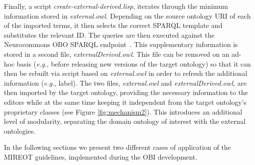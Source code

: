 \documentclass{ao2e}%
\begin{document}
Finally, a script \emph{create-external-derived.lisp}, iterates through the minimum information stored in \emph{external.owl}.
Depending on the source ontology URI of each of the imported terms, it then selects the correct SPARQL template and substitutes the relevant ID.
The queries are then executed against the Neurocommons OBO SPARQL endpoint~\cite{NeurocommonsSparql,Neurocommons}. This supplementary information is stored in a second file, \emph{externalDerived.owl}.
This file can be removed on an ad-hoc basis (\emph{e.g.}, before releasing new versions of the target ontology) so that it can then be rebuilt via script based on \emph{external.owl} in order to refresh the additional information (\emph{e.g.}, label). The two files, \emph{external.owl} and \emph{externalDerived.owl}, are then imported by the target ontology, providing the necessary information to the editors while at the same time keeping it independent from the target ontology's proprietary classes (see Figure \ref{fig:mechanism2}). This introduces an additional level of modularity, separating the domain ontology of interest with the external ontologies.%

In the following sections we present two different cases of application of the \ac{MIREOT} guidelines, implemented during the \ac{OBI} development.
\end{document}
